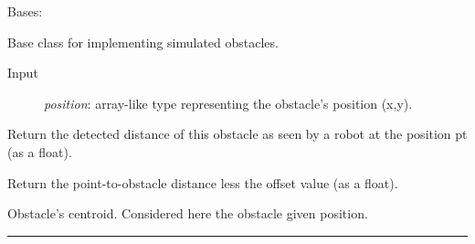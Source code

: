 \documentclass[letterpaper,10pt,english]{sphinxmanual}
\begin{document}
\begin{fulllineitems}
\label{Multi-robot motion planner:planning_sim.Obstacle}
Bases: \href{http://docs.python.org/library/functions.html\#object}{}

Base class for implementing simulated obstacles.
\begin{description}
\item[{Input}] \leavevmode
\emph{position}: array-like type representing the obstacle's position (x,y).

\end{description}

\begin{fulllineitems}
\label{Multi-robot motion planner:planning_sim.Obstacle.detected_dist}
Return the detected distance of this obstacle as seen by a robot at the position pt
(as a float).

\end{fulllineitems}


\begin{fulllineitems}
\label{Multi-robot motion planner:planning_sim.Obstacle.pt_2_obst}
Return the point-to-obstacle distance less the offset value (as a float).

\end{fulllineitems}


\begin{fulllineitems}
\label{Multi-robot motion planner:planning_sim.Obstacle.centroid}
Obstacle's centroid. Considered here the obstacle given position.

\end{fulllineitems}


\end{fulllineitems}



\bigskip\hrule{}\bigskip

\end{document}

